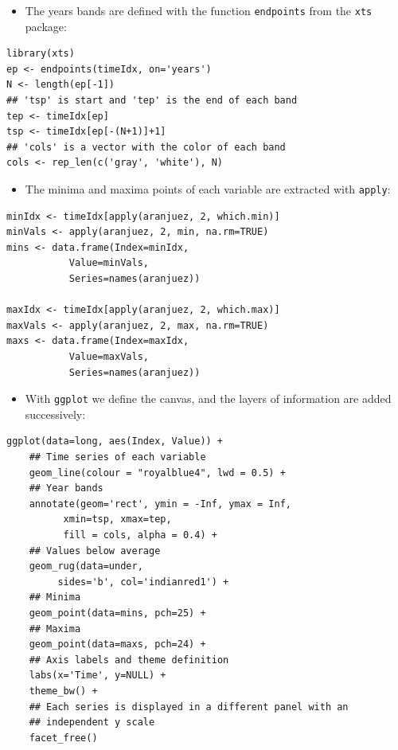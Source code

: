 \begin{itemize}
\item The years bands are defined with the function \texttt{endpoints} from the
  \texttt{xts} package:
\end{itemize}
\lstset{language=R,numbers=none}
\begin{lstlisting}
library(xts)
ep <- endpoints(timeIdx, on='years')
N <- length(ep[-1])
## 'tsp' is start and 'tep' is the end of each band
tep <- timeIdx[ep]
tsp <- timeIdx[ep[-(N+1)]+1]
## 'cols' is a vector with the color of each band
cols <- rep_len(c('gray', 'white'), N)
\end{lstlisting}
\begin{itemize}
\item The minima and maxima points of each variable are extracted with
  \texttt{apply}:
\end{itemize}
\lstset{language=R,numbers=none}
\begin{lstlisting}
minIdx <- timeIdx[apply(aranjuez, 2, which.min)]
minVals <- apply(aranjuez, 2, min, na.rm=TRUE)
mins <- data.frame(Index=minIdx,
		   Value=minVals,
		   Series=names(aranjuez))

maxIdx <- timeIdx[apply(aranjuez, 2, which.max)]
maxVals <- apply(aranjuez, 2, max, na.rm=TRUE)
maxs <- data.frame(Index=maxIdx,
		   Value=maxVals,
		   Series=names(aranjuez))
\end{lstlisting}

\begin{itemize}
\item With \texttt{ggplot} we define the canvas, and the layers of information are
added successively:
\end{itemize}
\lstset{language=R,numbers=none}
\begin{lstlisting}
ggplot(data=long, aes(Index, Value)) +
    ## Time series of each variable
    geom_line(colour = "royalblue4", lwd = 0.5) +
    ## Year bands
    annotate(geom='rect', ymin = -Inf, ymax = Inf,
	      xmin=tsp, xmax=tep,
	      fill = cols, alpha = 0.4) +
    ## Values below average
    geom_rug(data=under,
	     sides='b', col='indianred1') +
    ## Minima
    geom_point(data=mins, pch=25) +
    ## Maxima
    geom_point(data=maxs, pch=24) +
    ## Axis labels and theme definition
    labs(x='Time', y=NULL) +
    theme_bw() +
    ## Each series is displayed in a different panel with an
    ## independent y scale
    facet_free()
\end{lstlisting}


